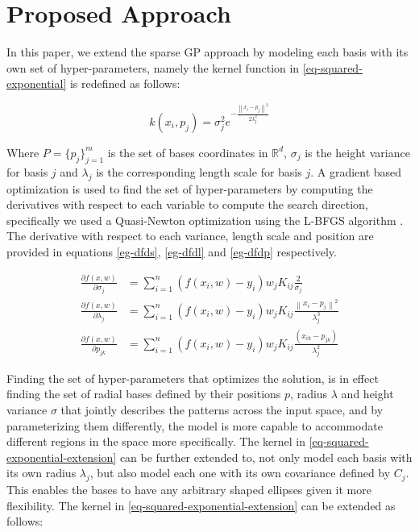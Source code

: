 \documentclass[a4paper,12pt]{article}
\begin{document}
\section{Proposed Approach}
\label{sec-proposed-approach}

In this paper, we extend the sparse GP approach by modeling each basis with its own set of hyper-parameters, namely the kernel function in \eqref{eq-squared-exponential} is redefined as follows:

\begin{equation}
\label{eq-squared-exponential-extension}
k(x_{i},p_{j}) = \sigma_{j}^{2}e^{-\frac{\left\| x_{i}-p_{j}\right\|^{2}}{2\lambda_{j}^{2}}}
\end{equation}

Where $P=\{p_{j}\}_{j=1}^{m}$ is the set of bases coordinates in $\mathbb{R}^{d}$, $\sigma_{j}$ is the height variance for basis $j$ and $\lambda_{j}$ is the corresponding length scale for basis $j$. A gradient based optimization is used to find the set of hyper-parameters by computing the derivatives with respect to each variable to compute the search direction, specifically we used a Quasi-Newton optimization using the L-BFGS algorithm \cite{}. The derivative with respect to each variance, length scale and position are provided in equations \eqref{eg-dfds}, \eqref{eg-dfdl} and \eqref{eg-dfdp} respectively. 

\begin{subequations}
\begin{align} 
\label{eg-dfds}
\frac{\partial f(x,w)}{\partial \sigma_{j}} &= \sum_{i=1}^{n}\left(f(x_{i},w)-y_{i}\right)w_{j}K_{ij}\frac{2}{\sigma_{j}} \\ 
\label{eg-dfdl}
\frac{\partial f(x,w)}{\partial \lambda_{j}} &= \sum_{i=1}^{n}\left(f(x_{i},w)-y_{i}\right)w_{j}K_{ij}\frac{\left\| x_{i}-p_{j}\right\|^{2}}{\lambda_{j}^{3}}\\
\label{eg-dfdp}
\frac{\partial f(x,w)}{\partial p_{jk}} &= \sum_{i=1}^{n}\left(f(x_{i},w)-y_{i}\right)w_{j}K_{ij}\frac{(x_{ik}-p_{jk})}{\lambda_{j}^{2}}
\end{align}
\end{subequations}


Finding the set of hyper-parameters that optimizes the solution, is in effect finding the set of radial bases defined by their positions $p$, radius $\lambda$ and height variance $\sigma$ that jointly describes the patterns across the input space, and by parameterizing them differently, the model is more capable to accommodate different regions in the space more specifically. The kernel in \eqref{eq-squared-exponential-extension} can be further extended to, not only model each basis with its own radius $\lambda_{j}$, but also model each one with its own covariance defined by $C_{j}$. This enables the bases to have any arbitrary shaped ellipses given it more flexibility. The kernel in \eqref{eq-squared-exponential-extension} can be extended as follows:
\end{document}
